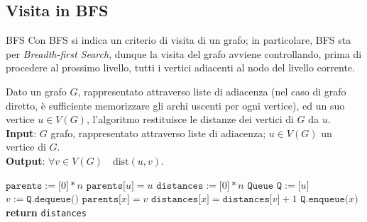 \documentclass[a4paper, 12pt]{report}
\begin{document}
    \subsection{Visita in BFS}

    \begin{frameddefn}{BFS}
        Con BFS si indica un criterio di visita di un grafo; in particolare, BFS sta per \textit{Breadth-first Search}, dunque la visita del grafo avviene controllando, prima di procedere al prossimo livello, tutti i vertici adiacenti al nodo del livello corrente.
    \end{frameddefn}

    \begin{algorithm}[H]
        \caption{
            Dato un grafo $G$, rappresentato attraverso liste di adiacenza (nel caso di grafo diretto, è sufficiente memorizzare gli archi uscenti per ogni vertice), ed un suo vertice $u \in V(G)$, l'algoritmo restituisce le distanze dei vertici di $G$ da $u$.\\
            \textbf{Input}: $G$ grafo, rappresentato attraverso liste di adiacenza; $u \in V(G)$ un vertice di $G$.\\
            \textbf{Output}: $\forall v \in V(G) \quad \mathrm{dist}(u, v)$.
        }

        \begin{algorithmic}[1]
            \label{bfs}

                \State $\texttt{parents}:=\texttt{[}0\texttt{]} * n$
                \State $\texttt{parents[}u\texttt{]} = u$
                \State $\texttt{distances}:=\texttt{[}0\texttt{]} * n$
                \State $\texttt{Queue Q} := \texttt{[}u\texttt{]}$
                    \State $v := \texttt{Q.dequeue()}$
                        \State $\texttt{parents[}x\texttt{]} = v$
                        \State $\texttt{distances[}x\texttt{]}=\texttt{distances[}v\texttt{]} + 1$
                        \State $\texttt{Q.enqueue(}x\texttt{)}$
                    \EndIf
                    \EndFor
                \EndWhile
                \State \textbf{return} \texttt{distances}
            \EndFunction
        \end{algorithmic}
    \end{algorithm}
\end{document}

